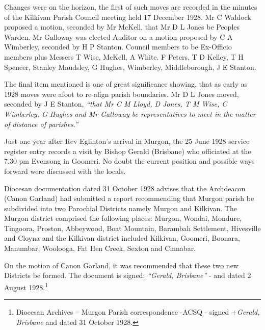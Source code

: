 Changes were on the horizon, the first of such moves are recorded in the minutes of the Kilkivan Parish Council meeting held 17 December 1928. Mr C Waldock proposed a motion, seconded by Mr McKell, that Mr D L Jones be Peoples Warden. Mr Galloway was elected Auditor on a motion proposed by C A Wimberley, seconded by H P Stanton. Council members to be Ex-Officio members plus Messers T Wise, McKell, A White. F Peters, T D Kelley, T H Spencer, Stanley Maudsley, G Hughes, Wimberley, Middleborough, J E Stanton.



The final item mentioned is one of great significance showing, that as early as 1928 moves were afoot to re-align parish boundaries. Mr D L Jones moved, seconded by J E Stanton, \emph{``that Mr C M Lloyd, D Jones, T M Wise, C Wimberley, G Hughes and Mr Galloway be representatives to meet in the matter of distance of parishes.''}



Just one year after Rev Eglinton's arrival in Murgon, the 25 June 1928 service register entry records a visit by Bishop Gerald (Brisbane) who officiated at the 7.30 pm Evensong in Goomeri. No doubt the current position and possible ways forward were discussed with the locals.



Diocesan documentation dated 31 October 1928 advises that the Archdeacon (Canon Garland) had submitted a report recommending that Murgon parish be subdivided into two Parochial Districts namely Murgon and Kilkivan. The Murgon district comprised the following places: Murgon, Wondai, Mondure, Tingoora, Proston, Abbeywood, Boat Mountain, Barambah Settlement, Hivesville and Cloyna and the Kilkivan district included Kilkivan, Goomeri, Boonara, Manumbar, Woolooga, Fat Hen Creek, Sexton and Cinnabar.



On the motion of Canon Garland, it was recommended that these two new Districts be formed. The document is signed: \emph{``Gerald, Brisbane''} - and dated 2 August 1928.\footnote{Diocesan Archives -- Murgon Parish correspondence -ACSQ - signed +\emph{Gerald, Brisbane} and dated 31 October 1928.}


